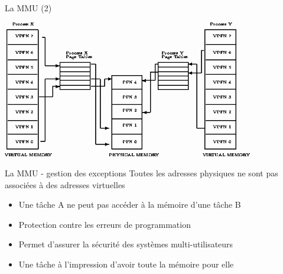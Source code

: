 \begin{frame}{La MMU (2)}
  \begin{center}
    \includegraphics[height=6cm]{pics/img9}
  \end{center}
\end{frame}

\begin{frame}{La MMU - gestion des exceptions}
  Toutes les adresses physiques ne sont pas associées à des adresses
  virtuelles
  \begin{itemize}
  \item Une tâche A ne peut pas accéder à la mémoire d'une tâche B
  \item Protection contre les erreurs de programmation
  \item Permet d'assurer la sécurité des systèmes multi-utilisateurs
  \item Une tâche à l'impression d'avoir toute la mémoire pour elle
  \end{itemize}
\end{frame}

